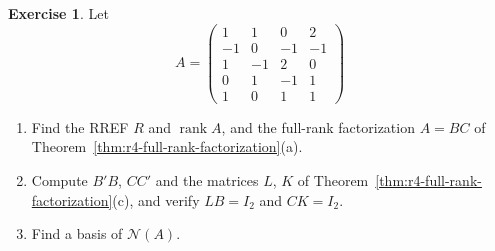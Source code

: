 \documentclass[12pt]{article}
\DeclareMathOperator{\rank}{rank}
\theoremstyle{definition}
\newtheorem{exercise}{Exercise}
\begin{document}
\begin{exercise}\label{ex:r4-factorization-drill}
Let
\[
A=\begin{pmatrix}1&1&0&2\\-1&0&-1&-1\\1&-1&2&0\\0&1&-1&1\\1&0&1&1\end{pmatrix}
\]
\begin{enumerate}
\item Find the RREF \(R\) and \(\rank A\), and the full-rank factorization \(A=BC\) of
Theorem~\ref{thm:r4-full-rank-factorization}(a).
\item Compute \(B'B\), \(CC'\) and the matrices \(L\), \(K\) of
Theorem~\ref{thm:r4-full-rank-factorization}(c), and verify \(LB=I_2\) and \(CK=I_2\).
\item Find a basis of \(\mathcal N(A)\).
\end{enumerate}
\end{exercise}
\end{document}
